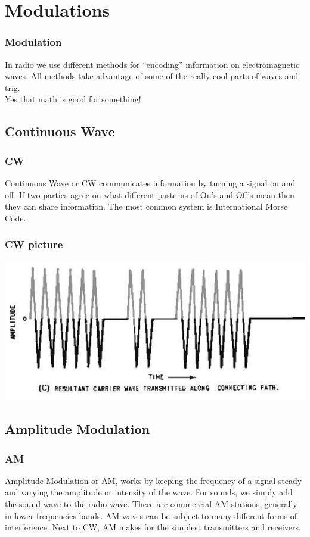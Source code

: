 \documentclass[10pt, handout]{beamer}
\begin{document}
\section{Modulations}

\begin{frame}
\frametitle{Modulation}
In radio we use different methods for ``encoding'' information on electromagnetic waves. All methods take advantage of some of the really cool parts of waves and trig.\\
Yes that math is good for something!
\end{frame}

\subsection{Continuous Wave}

\begin{frame}
\frametitle{CW}
Continuous Wave or CW communicates information by turning a signal on and off. If two parties agree on what different pasterns of On's and Off's mean then they can share information. The most common system is International Morse Code. 
\end{frame}

\begin{frame}
\frametitle{CW picture}
\includegraphics[height=.5\textheight]{cw.png}
\end{frame}

\subsection{Amplitude Modulation}

\begin{frame}
\frametitle{AM}
Amplitude Modulation or AM, works by keeping the frequency of a signal steady and varying the amplitude or intensity of the wave. For sounds, we simply add the sound wave to the radio wave. There are commercial AM stations, generally in lower frequencies bands. AM waves can be subject to many different forms of interference. Next to CW, AM makes for the simplest transmitters and receivers.
\end{frame}
\end{document}
